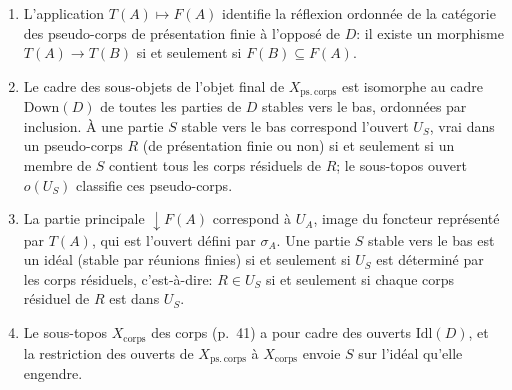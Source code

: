 \begin{theorem}\label{th:pf-frame}
\begin{enumerate}
\item L'application $T(A)\mapsto F(A)$ identifie la réflexion ordonnée de la catégorie des pseudo-corps de présentation finie à l'opposé de $D$: il existe un morphisme $T(A)\to T(B)$ si et seulement si $F(B)\subseteq F(A)$.
\item Le cadre des sous-objets de l'objet final de $X_{\mathrm{ps.\,corps}}$ est isomorphe au cadre $\mathrm{Down}(D)$ de toutes les parties de $D$ stables vers le bas, ordonnées par inclusion. À une partie $S$ stable vers le bas correspond l'ouvert $U_S$, vrai dans un pseudo-corps $R$ (de présentation finie ou non) si et seulement si un membre de $S$ contient tous les corps résiduels de $R$; le sous-topos ouvert $o(U_S)$ classifie ces pseudo-corps.
\item La partie principale ${\downarrow}F(A)$ correspond à $U_A$, image du foncteur représenté par $T(A)$, qui est l'ouvert défini par $\sigma_A$. Une partie $S$ stable vers le bas est un idéal (stable par réunions finies) si et seulement si $U_S$ est déterminé par les corps résiduels, c'est-à-dire: $R\in U_S$ si et seulement si chaque corps résiduel de $R$ est dans $U_S$.
\item Le sous-topos $X_{\mathrm{corps}}$ des corps (p.~41) a pour cadre des ouverts $\mathrm{Idl}(D)$, et la restriction des ouverts de $X_{\mathrm{ps.\,corps}}$ à $X_{\mathrm{corps}}$ envoie $S$ sur l'idéal qu'elle engendre.
\end{enumerate}
\end{theorem}

